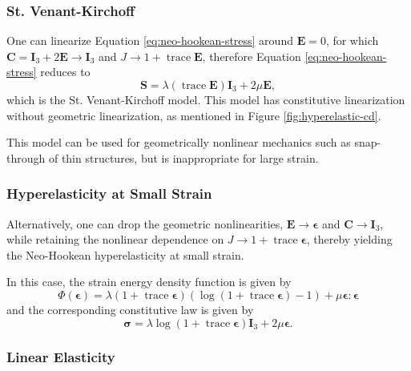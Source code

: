 \subsubsection{St. Venant-Kirchoff}

One can linearize Equation \ref{eq:neo-hookean-stress} around $\mathbf E = 0$, for which $\mathbf C = \mathbf I_3 + 2 \mathbf E \to \mathbf I_3$ and $J \to 1 + \operatorname{trace} \mathbf E$, therefore Equation \ref{eq:neo-hookean-stress} reduces to
\begin{equation}
      \mathbf S = \lambda (\operatorname{trace} \mathbf E) \mathbf I_3 + 2 \mu \mathbf E,
      \label{eq:st-venant-kirchoff}
\end{equation}
which is the St. Venant-Kirchoff model.
This model has constitutive linearization without geometric linearization, as mentioned in Figure \ref{fig:hyperelastic-cd}.

This model can be used for geometrically nonlinear mechanics such as snap-through of thin structures, but is inappropriate for large strain.

\subsubsection{Hyperelasticity at Small Strain}

Alternatively, one can drop the geometric nonlinearities, $\mathbf E \to \boldsymbol \epsilon$ and $\mathbf C \to \mathbf I_3$, while retaining the nonlinear dependence on $J \to 1 + \operatorname{trace} \boldsymbol \epsilon$, thereby yielding the Neo-Hookean hyperelasticity at small strain.

In this case, the strain energy density function is given by
\begin{equation}
\Phi \left( \boldsymbol \epsilon \right) = \lambda \left( 1 + \operatorname{trace} \boldsymbol \epsilon \right) \left( \log \left( 1 + \operatorname{trace} \boldsymbol \epsilon \right) - 1 \right) + \mu \boldsymbol \epsilon : \boldsymbol \epsilon
\end{equation}
and the corresponding constitutive law is given by
\begin{equation}
\boldsymbol \sigma = \lambda \log \left( 1 + \operatorname{trace} \boldsymbol \epsilon \right) \mathbf I_3 + 2 \mu \boldsymbol \epsilon.
\end{equation}

\subsubsection{Linear Elasticity}

